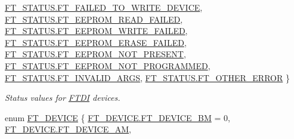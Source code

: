 \begin{DoxyCompactItemize}
\mbox{\hyperlink{class_f_t_d2_x_x___n_e_t_1_1_f_t_d_i_aabe20ad905cc4ccc1e35dd5b877d9a83ad48ade6ce967484fa2b3b25b8f7a73b0}{F\+T\+\_\+\+S\+T\+A\+T\+U\+S.\+F\+T\+\_\+\+F\+A\+I\+L\+E\+D\+\_\+\+T\+O\+\_\+\+W\+R\+I\+T\+E\+\_\+\+D\+E\+V\+I\+CE}}, 
\mbox{\hyperlink{class_f_t_d2_x_x___n_e_t_1_1_f_t_d_i_aabe20ad905cc4ccc1e35dd5b877d9a83aaa6a22a69c0ffd606a16adab51d927df}{F\+T\+\_\+\+S\+T\+A\+T\+U\+S.\+F\+T\+\_\+\+E\+E\+P\+R\+O\+M\+\_\+\+R\+E\+A\+D\+\_\+\+F\+A\+I\+L\+ED}}, 
\newline
\mbox{\hyperlink{class_f_t_d2_x_x___n_e_t_1_1_f_t_d_i_aabe20ad905cc4ccc1e35dd5b877d9a83a4ca86a89eab9f8d60878f97991fc8ed8}{F\+T\+\_\+\+S\+T\+A\+T\+U\+S.\+F\+T\+\_\+\+E\+E\+P\+R\+O\+M\+\_\+\+W\+R\+I\+T\+E\+\_\+\+F\+A\+I\+L\+ED}}, 
\mbox{\hyperlink{class_f_t_d2_x_x___n_e_t_1_1_f_t_d_i_aabe20ad905cc4ccc1e35dd5b877d9a83afa7ff97664720195f5369155f9623bf7}{F\+T\+\_\+\+S\+T\+A\+T\+U\+S.\+F\+T\+\_\+\+E\+E\+P\+R\+O\+M\+\_\+\+E\+R\+A\+S\+E\+\_\+\+F\+A\+I\+L\+ED}}, 
\mbox{\hyperlink{class_f_t_d2_x_x___n_e_t_1_1_f_t_d_i_aabe20ad905cc4ccc1e35dd5b877d9a83ae966c39673f9981300d134ccb95d97fc}{F\+T\+\_\+\+S\+T\+A\+T\+U\+S.\+F\+T\+\_\+\+E\+E\+P\+R\+O\+M\+\_\+\+N\+O\+T\+\_\+\+P\+R\+E\+S\+E\+NT}}, 
\mbox{\hyperlink{class_f_t_d2_x_x___n_e_t_1_1_f_t_d_i_aabe20ad905cc4ccc1e35dd5b877d9a83a00c9ff148751d1e44d6d904043f01776}{F\+T\+\_\+\+S\+T\+A\+T\+U\+S.\+F\+T\+\_\+\+E\+E\+P\+R\+O\+M\+\_\+\+N\+O\+T\+\_\+\+P\+R\+O\+G\+R\+A\+M\+M\+ED}}, 
\newline
\mbox{\hyperlink{class_f_t_d2_x_x___n_e_t_1_1_f_t_d_i_aabe20ad905cc4ccc1e35dd5b877d9a83ada5f96e7b9a556f9c7985827040b543f}{F\+T\+\_\+\+S\+T\+A\+T\+U\+S.\+F\+T\+\_\+\+I\+N\+V\+A\+L\+I\+D\+\_\+\+A\+R\+GS}}, 
\mbox{\hyperlink{class_f_t_d2_x_x___n_e_t_1_1_f_t_d_i_aabe20ad905cc4ccc1e35dd5b877d9a83a2934928efb6b016ccdd2226972d4aa74}{F\+T\+\_\+\+S\+T\+A\+T\+U\+S.\+F\+T\+\_\+\+O\+T\+H\+E\+R\+\_\+\+E\+R\+R\+OR}}
 \}
\begin{DoxyCompactList}\small\item\em Status values for \mbox{\hyperlink{class_f_t_d2_x_x___n_e_t_1_1_f_t_d_i}{F\+T\+DI}} devices. \end{DoxyCompactList}\item 
enum \mbox{\hyperlink{class_f_t_d2_x_x___n_e_t_1_1_f_t_d_i_a7f69db13362f65d251d6b16e3eec585f}{F\+T\+\_\+\+D\+E\+V\+I\+CE}} \{ \newline
\mbox{\hyperlink{class_f_t_d2_x_x___n_e_t_1_1_f_t_d_i_a7f69db13362f65d251d6b16e3eec585faf21587eb0f8dec5fa25356086ca1d789}{F\+T\+\_\+\+D\+E\+V\+I\+C\+E.\+F\+T\+\_\+\+D\+E\+V\+I\+C\+E\+\_\+\+BM}} = 0, 
\mbox{\hyperlink{class_f_t_d2_x_x___n_e_t_1_1_f_t_d_i_a7f69db13362f65d251d6b16e3eec585fa2072dc8041865df40066a4aa5eb99e7f}{F\+T\+\_\+\+D\+E\+V\+I\+C\+E.\+F\+T\+\_\+\+D\+E\+V\+I\+C\+E\+\_\+\+AM}}, 

\end{DoxyCompactItemize}
